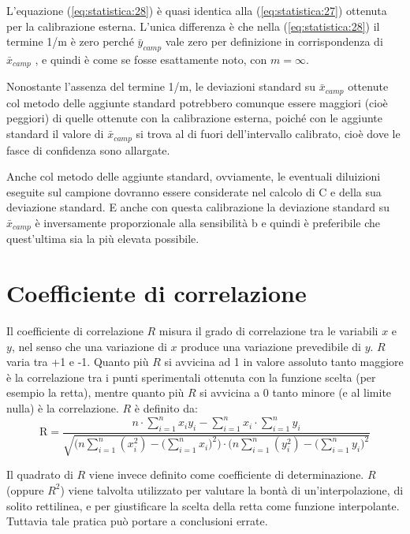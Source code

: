 L'equazione (\ref{eq:statistica:28}) è quasi identica alla (\ref{eq:statistica:27}) ottenuta per la calibrazione esterna. L'unica differenza è che nella (\ref{eq:statistica:28}) il termine 1/m è zero perché $\bar{y}_{camp}$ vale zero per definizione in corrispondenza di $\bar{x}_{camp}$ , e quindi è come se fosse esattamente noto, con $m = \infty$.

Nonostante l'assenza del termine 1/m, le deviazioni standard su $\bar{x}_{camp}$ ottenute col metodo delle aggiunte standard potrebbero comunque essere maggiori (cioè peggiori) di quelle ottenute con la calibrazione esterna, poiché con le aggiunte standard il valore di $\bar{x}_{camp}$ si trova al di fuori dell'intervallo calibrato, cioè dove le fasce di confidenza sono allargate.

Anche col metodo delle aggiunte standard, ovviamente, le eventuali diluizioni eseguite sul campione dovranno essere considerate nel calcolo di C e della sua deviazione standard. E anche con questa calibrazione la deviazione standard su $\bar{x}_{camp}$ è inversamente proporzionale alla sensibilità b e quindi è preferibile che quest'ultima sia la più elevata possibile.

\section{Coefficiente di correlazione}

Il coefficiente di correlazione $R$ misura il grado di correlazione tra le variabili $x$ e $y$, nel senso che una variazione di $x$ produce una variazione prevedibile di $y$. $R$ varia tra +1 e -1. Quanto più $R$ si avvicina ad 1 in valore assoluto tanto maggiore è la correlazione tra i punti sperimentali ottenuta con la funzione scelta (per esempio la retta), mentre quanto più $R$ si avvicina a 0 tanto minore (e al limite nulla) è la correlazione. $R$ è definito da:
\begin{equation} \label{eq:statistica:29}
\mathrm{R} = \frac{n \cdot \sum_{i=1}^n x_i y_i - \sum_{i=1}^n x_i \cdot \sum_{i=1}^n y_i}{\sqrt{\Biggl(n \sum_{i=1}^n (x_i^2) - \biggl(\sum_{i=1}^n x_i \biggr)^2 \Biggr) \cdot \Biggl(n \sum_{i=1}^n (y_i^2) - \biggl(\sum_{i=1}^n y_i \biggr)^2}}
\end{equation}

Il quadrato di $R$ viene invece definito come coefficiente di determinazione. $R$ (oppure $R^2$) viene talvolta utilizzato per valutare la bontà di un'interpolazione, di solito rettilinea, e per giustificare la scelta della retta come funzione interpolante. Tuttavia tale pratica può portare a conclusioni errate.

